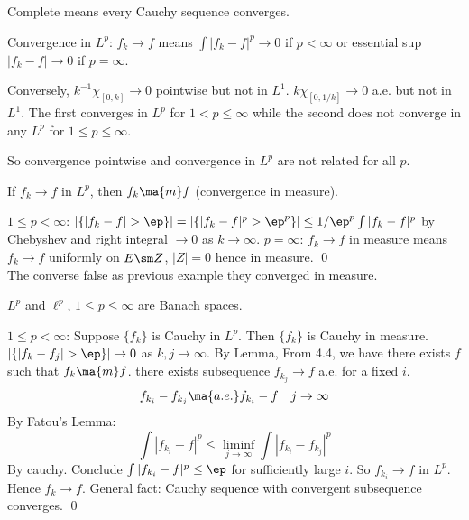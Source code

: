 Complete means every Cauchy sequence converges. 



Convergence in $L^p$: $f_k \to f$ means $\int |f_k-f|^p \to 0$ if $p<\infty$ or essential sup $|f_k-f| \to 0$ if $p= \infty$. 


\begin{ex}
%
Conversely, $k^{-1} \chi_{[0,k]} \to 0$ pointwise but not in $L^1$. $k \chi_{[0,1/k]} \to 0$ a.e. but not in $L^1$. The first converges in $L^p$ for $1<p \leq \infty$ while the second does not converge in any $L^p$ for $1 \leq p \leq \infty$. 

\end{ex}

So convergence pointwise and convergence in $L^p$ are not related for all $p$.


\begin{lem}
If $f_k \to f$ in $L^p$, then $f_k \ma{m} f$ (convergence in measure). 
\end{lem}

\pf $1 \leq p <\infty$: $|\{|f_k-f|>\ep\}|= |\{|f_k-f|^p>\ep^p\}| \leq 1/\ep^p \int |f_k-f|^p$ by Chebyshev and right integral $\to 0$ as $k \to \infty$. $p=\infty$: $f_k \to f$ in measure means $f_k \to f$ uniformly on $E\sm Z$, $|Z|=0$ hence in measure. \qed \\


The converse false as previous example they converged in measure.


\begin{thm} 
$L^p$ and $\ell^p$, $1 \leq p \leq \infty$ are Banach spaces.
\end{thm}


$1 \leq p<\infty$: Suppose $\{f_k\}$ is Cauchy in $L^p$. Then $\{f_k\}$ is Cauchy in measure. $|\{ |f_k-f_j|>\ep\}| \to 0$ as $k,j \to \infty$. By Lemma, From 4.4, we have there exists $f$ such that $f_k \ma{m} f$. there exists subsequence $f_{k_j} \to f$ a.e. for a fixed $i$.
	\[
	f_{k_i} - f_{k_j} \ma{a.e.} f_{k_i} - f \quad j \to \infty
	\]
By Fatou's Lemma: 
	\[
	\int |f_{k_i}-f|^p \leq \liminf_{j \to \infty} \int |f_{k_i} - f_{k_j}|^p
	\]
By cauchy. Conclude $\int |f_{k_i} - f|^p \leq \ep$ for sufficiently large $i$. So $f_{k_i} \to f$ in $L^p$. Hence $f_k \to f$. General fact: Cauchy sequence with convergent subsequence converges. \qed \\

